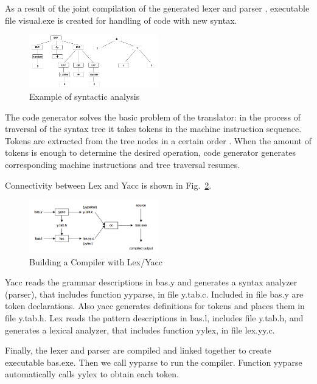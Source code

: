 \documentclass[a4paper, 10pt, conference]{ieeeconf}
\begin{document}
As a result of the joint compilation of the generated lexer and parser , executable file visual.exe is created for handling of code with new syntax.

\begin{figure}[h]
    \centering
    \includegraphics[width=0.5\textwidth]{parsetree.png}
    \caption{Example of syntactic analysis}
    \label{fig:parsetree}
\end{figure}

The code generator solves the basic problem of the translator: in the process of traversal of the syntax tree it takes tokens in the machine instruction sequence. Tokens are extracted from the tree nodes in a certain order . When the amount of tokens is enough to determine the desired operation, code generator generates corresponding machine instructions and tree traversal resumes.

Connectivity between Lex and Yacc is shown in Fig.~\ref{fig:generation}.

\begin{figure}[h]
    \centering
    \includegraphics[width=0.5\textwidth]{generation.png}
    \caption{Building a Compiler with Lex/Yacc}
    \label{fig:generation}
\end{figure}

Yacc reads the grammar descriptions in bas.y and generates a syntax analyzer (parser), that includes function yyparse, in file y.tab.c. Included in file bas.y are token declarations. Also yacc generates definitions for tokens and places them in file y.tab.h. Lex reads the pattern descriptions in bas.l, includes file y.tab.h, and generates a lexical analyzer, that includes function yylex, in file lex.yy.c.

Finally, the lexer and parser are compiled and linked together to create executable bas.exe. Then we call yyparse to run the compiler. Function yyparse automatically calls yylex to obtain each token\cite{c2}.
\end{document}
